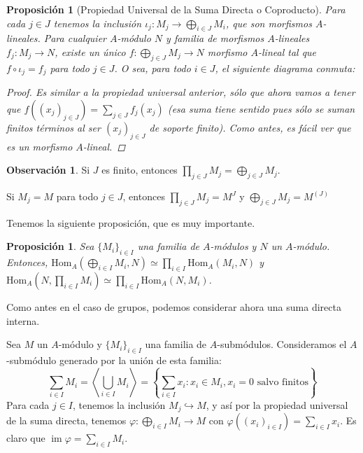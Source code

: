 \documentclass[12pt]{book}
\newtheorem{prop}[teo]{Proposición}
\theoremstyle{definition}
\newtheorem{obs}[teo]{Observación}
\renewcommand{\hom}{\mathrm{Hom}}
\DeclareMathOperator{\im}{im}
\begin{document}
\begin{prop}[Propiedad Universal de la Suma Directa o Coproducto]
Para cada $j\in J$ tenemos la inclusión $\iota_j:M_j\to \displaystyle\bigoplus_{i\in J}M_i$, que son morfismos $A$-lineales. Para cualquier $A$-módulo $N$ y familia de morfismos $A$-lineales $f_j:M_j\to N$, existe un único $f:\displaystyle\bigoplus_{j\in J}M_j\to N$ morfismo $A$-lineal tal que $f\circ \iota_j = f_j$ para todo $j\in J$. O sea, para todo $i\in J$, el siguiente diagrama conmuta:
\begin{proof}
Es similar a la propiedad universal anterior, sólo que ahora vamos a tener que $f((x_j)_{j\in J})=\displaystyle\sum_{j\in J}f_j(x_j)$ (esa suma tiene sentido pues sólo se suman finitos términos al ser $(x_j)_{j\in J}$ de soporte finito). Como antes, es fácil ver que es un morfismo $A$-lineal.
\end{proof}
\end{prop}

\begin{obs}
Si $J$ es finito, entonces $\displaystyle\prod_{j\in J}M_j=\displaystyle\bigoplus_{j\in J}M_j$.

Si $M_j=M$ para todo $j\in J$, entonces $\displaystyle\prod_{j\in J}M_j=M^J$ y $\displaystyle\bigoplus_{j\in J}M_j =  M^{(J)}$
\end{obs}

Tenemos la siguiente proposición, que es muy importante.

\begin{prop}
Sea $\{M_i\}_{i\in I}$ una familia de $A$-módulos y $N$ un $A$-módulo. Entonces, $\hom_A\left(\displaystyle\bigoplus_{i\in I} M_i, N\right) \simeq \displaystyle\prod_{i\in I} \hom_A(M_i, N)$ y $\hom_A\left(N,\displaystyle\prod_{i\in I}M_i\right)\simeq \displaystyle\prod_{i\in I}\hom_A(N,M_i)$.
\end{prop}

Como antes en el caso de grupos, podemos considerar ahora una suma directa interna.

Sea $M$ un $A$-módulo y $\{M_i\}_{i\in I}$ una familia de $A$-submódulos. Consideramos el $A$-submódulo generado por la unión de esta familia: $$\displaystyle\sum_{i\in I}M_i = \left\langle \displaystyle\bigcup_{i\in I}M_i \right\rangle = \left\{ \displaystyle\sum_{i\in I} x_i : x_i\in M_i, x_i=0 \text{ salvo finitos}\right\}$$ Para cada $j\in I$, tenemos la inclusión $M_j\hookrightarrow M$, y así por la propiedad universal de la suma directa, tenemos $\varphi:\displaystyle\bigoplus_{i\in I} M_i\to M$ con $\varphi\left((x_i)_{i\in I}\right) = \displaystyle\sum_{i\in I}x_i$. Es claro que $\im\varphi = \displaystyle\sum_{i\in I} M_i$. 
\end{document}
